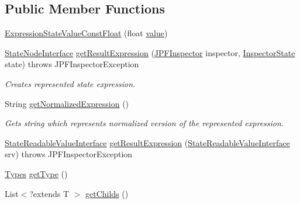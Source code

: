 \subsection*{Public Member Functions}
\begin{DoxyCompactItemize}
\item 
\hyperlink{classgov_1_1nasa_1_1jpf_1_1inspector_1_1server_1_1expression_1_1expressions_1_1_expression_state_value_const_float_a33c138ce97f60b2ccf1292f9aa7f0fe9}{Expression\+State\+Value\+Const\+Float} (float \hyperlink{classgov_1_1nasa_1_1jpf_1_1inspector_1_1server_1_1expression_1_1expressions_1_1_expression_state_value_const_float_a19b7c4061f54cd4ef3121ebb9d6c8e65}{value})
\item 
\hyperlink{interfacegov_1_1nasa_1_1jpf_1_1inspector_1_1server_1_1programstate_1_1_state_node_interface}{State\+Node\+Interface} \hyperlink{classgov_1_1nasa_1_1jpf_1_1inspector_1_1server_1_1expression_1_1expressions_1_1_expression_state_value_const_float_a6469a65a6c69ab78e0cacad7b62c3b1f}{get\+Result\+Expression} (\hyperlink{classgov_1_1nasa_1_1jpf_1_1inspector_1_1server_1_1jpf_1_1_j_p_f_inspector}{J\+P\+F\+Inspector} inspector, \hyperlink{interfacegov_1_1nasa_1_1jpf_1_1inspector_1_1server_1_1expression_1_1_inspector_state}{Inspector\+State} state)  throws J\+P\+F\+Inspector\+Exception 
\begin{DoxyCompactList}\small\item\em Creates represented state expression. \end{DoxyCompactList}\item 
String \hyperlink{classgov_1_1nasa_1_1jpf_1_1inspector_1_1server_1_1expression_1_1expressions_1_1_expression_state_value_const_float_aedd6f475efc09580ba128165d42760df}{get\+Normalized\+Expression} ()
\begin{DoxyCompactList}\small\item\em Gets string which represents normalized version of the represented expression. \end{DoxyCompactList}\item 
\hyperlink{interfacegov_1_1nasa_1_1jpf_1_1inspector_1_1server_1_1programstate_1_1_state_readable_value_interface}{State\+Readable\+Value\+Interface} \hyperlink{classgov_1_1nasa_1_1jpf_1_1inspector_1_1server_1_1expression_1_1expressions_1_1_expression_state_value_const_a11bde76b1048dc08cc72bb596c357c7c}{get\+Result\+Expression} (\hyperlink{interfacegov_1_1nasa_1_1jpf_1_1inspector_1_1server_1_1programstate_1_1_state_readable_value_interface}{State\+Readable\+Value\+Interface} srv)  throws J\+P\+F\+Inspector\+Exception 
\item 
\hyperlink{enumgov_1_1nasa_1_1jpf_1_1inspector_1_1server_1_1expression_1_1_types}{Types} \hyperlink{classgov_1_1nasa_1_1jpf_1_1inspector_1_1server_1_1expression_1_1expressions_1_1_expression_state_value_a9317f49f60c166a2f46f90702e75f22e}{get\+Type} ()
\item 
List$<$?extends T $>$ \hyperlink{classgov_1_1nasa_1_1jpf_1_1inspector_1_1server_1_1expression_1_1_expression_state_unary_operator_ad010bcb9c4e2eb584321b5ceba8e1682}{get\+Childs} ()
\end{DoxyCompactItemize}
